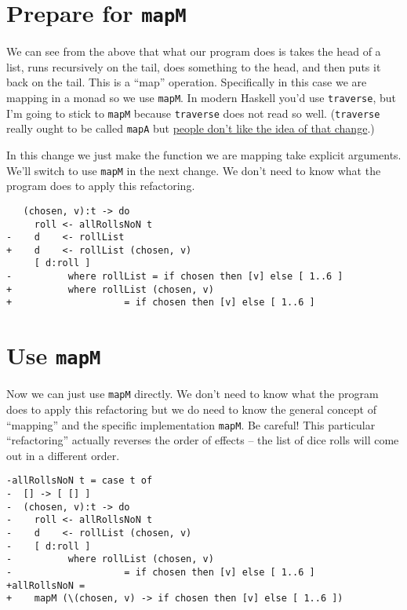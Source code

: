 \section{Prepare for \texttt{mapM}}

We can see from the above that what our program does is takes the head of a list, runs recursively on the tail, does something to the head, and then puts it back on the tail. This is a ``map'' operation. Specifically in this case we are mapping in a monad so we use \texttt{mapM}. In modern Haskell you'd use \texttt{traverse}, but I'm going to stick to \texttt{mapM} because \texttt{traverse} does not read so well. (\texttt{traverse} really ought to be called \texttt{mapA} but \href{https://www.reddit.com/r/haskell/comments/68w09h/proposal_to_add_mapa_as_synonym_for_traverse/}{people don't like the idea of that change}.)

In this change we just make the function we are mapping take explicit arguments. We'll switch to use \texttt{mapM} in the next change. 
We don't need to know what the program does to apply this refactoring.

\begin{verbatim}
   (chosen, v):t -> do
     roll <- allRollsNoN t
-    d    <- rollList
+    d    <- rollList (chosen, v)
     [ d:roll ]
-          where rollList = if chosen then [v] else [ 1..6 ]
+          where rollList (chosen, v)
+                    = if chosen then [v] else [ 1..6 ]
\end{verbatim}

\section{Use \texttt{mapM}}

Now we can just use \texttt{mapM} directly. 
We don't need to know what the program does to apply this refactoring but we do need to know the general concept of ``mapping'' and the specific implementation \texttt{mapM}. Be careful! This particular ``refactoring'' actually reverses the order of effects -- the list of dice rolls will come out in a different order.

\begin{verbatim}
-allRollsNoN t = case t of
-  [] -> [ [] ]
-  (chosen, v):t -> do
-    roll <- allRollsNoN t
-    d    <- rollList (chosen, v)
-    [ d:roll ]
-          where rollList (chosen, v)
-                    = if chosen then [v] else [ 1..6 ]
+allRollsNoN =
+    mapM (\(chosen, v) -> if chosen then [v] else [ 1..6 ])
\end{verbatim}


